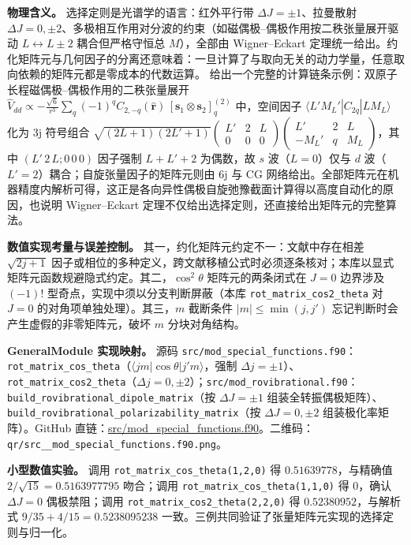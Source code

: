 \documentclass[
]{ctexbook}
\begin{document}
\textbf{物理含义。} 选择定则是光谱学的语言：红外平行带
\(\Delta J=\pm1\)、拉曼散射
\(\Delta J=0,\pm2\)、多极相互作用对分波的约束（如磁偶极--偶极作用按二秩张量展开驱动
\(L\leftrightarrow L\pm2\) 耦合但严格守恒总 \(M\)），全部由
Wigner--Eckart
定理统一给出。约化矩阵元与几何因子的分离还意味着：一旦计算了与取向无关的动力学量，任意取向依赖的矩阵元都是零成本的代数运算。
给出一个完整的计算链条示例：双原子长程磁偶极--偶极作用的二秩张量展开
\(\hat{V}_{dd}\propto-\frac{\sqrt{6}}{r^{3}}\sum_{q}(-1)^{q}C_{2,-q}(\hat{\mathbf{r}})\,[\mathbf{s}_1\otimes\mathbf{s}_2]^{(2)}_{q}\)
中，空间因子 \(\langle L'M_L'|C_{2q}|L M_L\rangle\) 化为 3j 符号组合
\(\sqrt{(2L+1)(2L'+1)}\begin{pmatrix} L' & 2 & L \\ 0 & 0 & 0\end{pmatrix}\begin{pmatrix} L' & 2 & L \\ -M_L' & q & M_L\end{pmatrix}\)，其中
\((L'\,2\,L;0\,0\,0)\) 因子强制 \(L+L'+2\) 为偶数，故 \(s\)
波（\(L=0\)）仅与 \(d\) 波（\(L'=2\)）耦合；自旋张量因子的矩阵元则由 6j
与 CG
网络给出。全部矩阵元在机器精度内解析可得，这正是各向异性偶极自旋弛豫截面计算得以高度自动化的原因，也说明
Wigner--Eckart 定理不仅给出选择定则，还直接给出矩阵元的完整算法。

\textbf{数值实现考量与误差控制。}
其一，约化矩阵元约定不一：文献中存在相差 \(\sqrt{2j+1}\)
因子或相位的多种定义，跨文献移植公式时必须逐条核对；本库以显式矩阵元函数规避隐式约定。其二，\(\cos^{2}\theta\)
矩阵元的两条闭式在 \(J=0\) 边界涉及 \((-1)!\)
型奇点，实现中须以分支判断屏蔽（本库 \texttt{rot\_matrix\_cos2\_theta}
对 \(J=0\) 的对角项单独处理）。其三，\(m\) 截断条件 \(|m|\le\min(j,j')\)
忘记判断时会产生虚假的非零矩阵元，破坏 \(m\) 分块对角结构。

\textbf{GeneralModule 实现映射。} 源码
\texttt{src/mod\_special\_functions.f90}：\texttt{rot\_matrix\_cos\_theta}（\(\langle j m|\cos\theta|j' m\rangle\)，强制
\(\Delta j=\pm1\)）、\texttt{rot\_matrix\_cos2\_theta}（\(\Delta j=0,\pm2\)）；\texttt{src/mod\_rovibrational.f90}：\texttt{build\_rovibrational\_dipole\_matrix}（按
\(\Delta J=\pm1\)
组装全转振偶极矩阵）、\texttt{build\_rovibrational\_polarizability\_matrix}（按
\(\Delta J=0,\pm2\) 组装极化率矩阵）。GitHub
直链：\href{https://github.com/l1Ha/QuantumGeneralModule/blob/main/src/mod_special_functions.f90}{src/mod\_special\_functions.f90}。二维码：\texttt{qr/src\_\_mod\_special\_functions.f90.png}。

\textbf{小型数值实验。} 调用 \texttt{rot\_matrix\_cos\_theta(1,2,0)} 得
\(0.51639778\)，与精确值 \(2/\sqrt{15}=0.5163977795\) 吻合；调用
\texttt{rot\_matrix\_cos\_theta(1,1,0)} 得 \(0\)，确认 \(\Delta J=0\)
偶极禁阻；调用 \texttt{rot\_matrix\_cos2\_theta(2,2,0)} 得
\(0.52380952\)，与解析式 \(9/35+4/15=0.5238095238\)
一致。三例共同验证了张量矩阵元实现的选择定则与归一化。
\end{document}
